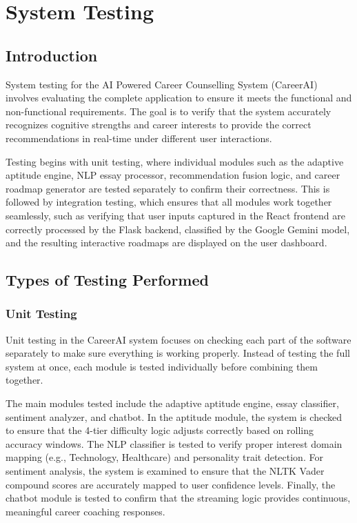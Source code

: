 \sloppy
\chapter{System Testing}
\section{Introduction}
{}System testing for the AI Powered Career Counselling System (CareerAI) involves evaluating the complete application to ensure it meets the functional and non-functional requirements. The goal is to verify that the system accurately recognizes cognitive strengths and career interests to provide the correct recommendations in real-time under different user interactions.

Testing begins with unit testing, where individual modules such as the adaptive aptitude engine, NLP essay processor, recommendation fusion logic, and career roadmap generator are tested separately to confirm their correctness. This is followed by integration testing, which ensures that all modules work together seamlessly, such as verifying that user inputs captured in the React frontend are correctly processed by the Flask backend, classified by the Google Gemini model, and the resulting interactive roadmaps are displayed on the user dashboard.
\section{Types of Testing Performed}
\subsection{Unit Testing}
{}Unit testing in the CareerAI system focuses on checking each part of the software separately to make sure everything is working properly. Instead of testing the full system at once, each module is tested individually before combining them together.

The main modules tested include the adaptive aptitude engine, essay classifier, sentiment analyzer, and chatbot. In the aptitude module, the system is checked to ensure that the 4-tier difficulty logic adjusts correctly based on rolling accuracy windows. The NLP classifier is tested to verify proper interest domain mapping (e.g., Technology, Healthcare) and personality trait detection. For sentiment analysis, the system is examined to ensure that the NLTK Vader compound scores are accurately mapped to user confidence levels. Finally, the chatbot module is tested to confirm that the streaming logic provides continuous, meaningful career coaching responses.


